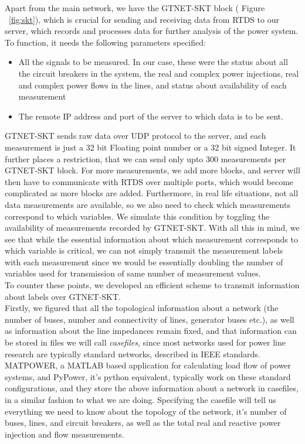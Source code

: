 Apart from the main network, we have the GTNET-SKT block ( Figure ~\ref{fig:skt}), which is crucial for sending and receiving data from RTDS to our server, which records and processes data for further analysis of the power system.  To function, it needs the following parameters specified:
\begin{itemize}
\item All the signals to be measured. In our case, these were the status about all the circuit breakers in the system, the real and complex power injections, real and complex power flows in the lines, and status about availability of each measurement
\item The remote IP address and port of the server to which data is to be sent. 
\end{itemize}
GTNET-SKT sends raw data over UDP protocol to the server, and each measurement is just a 32 bit Floating point number or a 32 bit signed Integer. 
It further places a restriction, that we can send only upto 300 measurements per GTNET-SKT block. For more measurements, we add more blocks, and server will then have to communicate with RTDS over multiple ports, which would become complicated as more blocks are added. 
Furthermore, in real life situations, not all data measurements are available, so we also need to check which measurements correspond to which variables. We simulate this condition by toggling the availability of measurements recorded by GTNET-SKT. 
With all this in mind, we see that while the essential information about which measurement corresponds to which variable is critical, we can not simply transmit the measurement labels with each measurement since we would be essentially doubling the number of variables used for transmission of same number of measurement values.\\
To counter these points, we developed an efficient scheme to transmit information about labels over GTNET-SKT.
\\Firstly, we figured that all the topological information about a network (the number of buses, number and connectivity of lines, generator buses etc.), as well as information about the line impedances remain fixed, and that information can be stored in files we will call \emph{casefiles}, since most networks used for power line research are typically standard networks, described in IEEE standards. MATPOWER, a MATLAB based application for calculating load flow of power systems, and PyPower, it's python equivalent, typically work on these standard configurations, and they store the above information about a network in casefiles, in a similar fashion to what we are doing. Specifying the casefile will tell us everything we need to know about the topology of the network, it's number of buses, lines, and circuit breakers, as well as the total real and reactive power injection and flow measurements.\\
